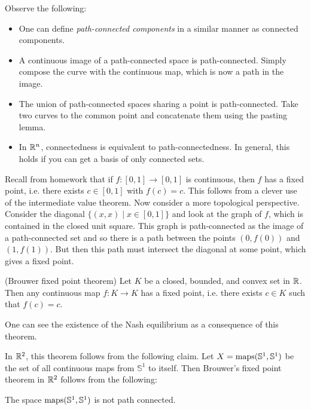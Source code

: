 \begin{remark}
  Observe the following:
  \begin{itemize}
    \item One can define \emph{path-connected components} in a similar
      manner as connected components.
    \item A continuous image of a path-connected
      space is path-connected. Simply compose
      the curve with the continuous map, which is
      now a path in the image.
    \item The union of path-connected spaces
      sharing a point is path-connected.
      Take two curves to the common point
      and concatenate them using the pasting lemma.
    \item In $\mathbb{R}^n$, connectedness is equivalent
      to path-connectedness. In general, this
      holds if you can get a basis of only connected
      sets.
  \end{itemize}
\end{remark}

\begin{remark}
  Recall from homework that if $f : [0, 1] \to [0, 1]$
  is continuous, then $f$ has a fixed point,
  i.e. there exists $c \in [0, 1]$ with $f(c) = c$.
  This follows from a clever use of the intermediate
  value theorem. Now consider a more topological
  perspective. Consider the diagonal
  $\{(x, x) \mid x \in [0, 1]\}$ and look at the
  graph of $f$, which is contained in the closed
  unit square. This graph is path-connected as the
  image of a path-connected set and so
  there is a path between the points $(0, f(0))$
  and $(1, f(1))$. But then this path must
  intersect the diagonal at some point, which
  gives a fixed point.
\end{remark}

\begin{theorem}(Brouwer fixed point theorem)
  Let $K$ be a closed, bounded, and convex
  set in $\mathbb{R}$. Then any continuous map $f : K \to K$
  has a fixed point, i.e. there exists $c \in K$
  such that $f(c) = c$.
\end{theorem}

\begin{remark}
  One can see the existence of the Nash equilibrium
  as a consequence of this theorem.
\end{remark}

\begin{remark}
  In $\mathbb{R}^2$, this theorem follows from the
  following claim. Let $X = \operatorname{maps}(\mathbb{S}^1, \mathbb{S}^1)$ be the set of all
  continuous maps from $\mathbb{S}^1$ to itself.
  Then Brouwer's fixed point theorem in $\mathbb{R}^2$
  follows from the following:
\end{remark}

\begin{theorem}
  The space $\operatorname{maps}(\mathbb{S}^1, \mathbb{S}^1)$ is not
  path connected.
\end{theorem}
